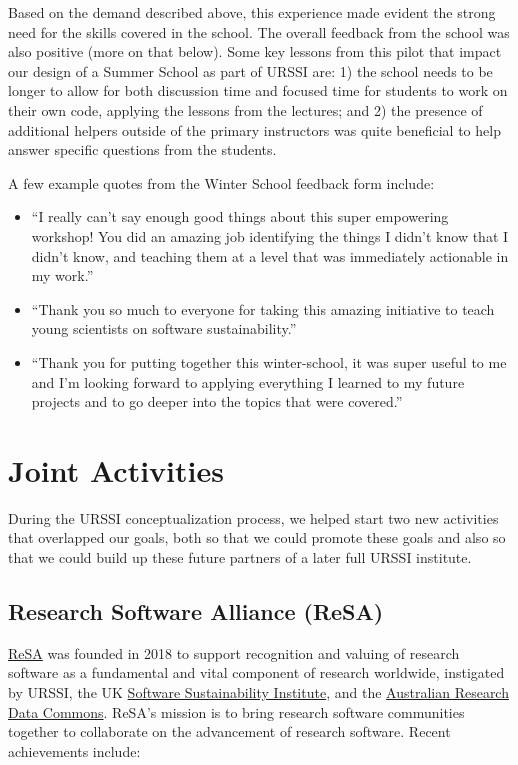 \documentclass[
]{book}
\begin{document}
Based on the demand described above, this experience made evident the strong
need for the skills covered in the school. The overall feedback from the
school was also positive (more on that below). Some key lessons from this
pilot that impact our design of a Summer School as part of URSSI are: 1) the
school needs to be longer to allow for both discussion time and focused time
for students to work on their own code, applying the lessons from the lectures;
and 2) the presence of additional helpers outside of the primary instructors was
quite beneficial to help answer specific questions from the students.

A few example quotes from the Winter School feedback form include:

\begin{itemize}
\item
  ``I really can't say enough good things about this super empowering workshop!
  You did an amazing job identifying the things I didn't know that I didn't know,
  and teaching them at a level that was immediately actionable in my work.''
\item
  ``Thank you so much to everyone for taking this amazing initiative to teach young
  scientists on software sustainability.''
\item
  ``Thank you for putting together this winter-school, it was super useful to me
  and I'm looking forward to applying everything I learned to my future projects
  and to go deeper into the topics that were covered.''
\end{itemize}

\hypertarget{joint-activities}{%
\section{Joint Activities}\label{joint-activities}}

During the URSSI conceptualization process, we helped start two new activities that
overlapped our goals, both so that we could promote these goals and also so
that we could build up these future partners of a later full URSSI institute.

\hypertarget{research-software-alliance-resa}{%
\subsection{Research Software Alliance (ReSA)}\label{research-software-alliance-resa}}

\href{http://www.researchsoft.org}{ReSA} was founded in 2018 to support recognition and valuing of research software as a
fundamental and vital component of research worldwide, instigated by URSSI,
the UK \href{https://software.ac.uk}{Software Sustainability Institute},
and the \href{https://ardc.edu.au}{Australian Research Data Commons}.
ReSA's mission is to bring research
software communities together to collaborate on the advancement of research software.
Recent achievements include:
\end{document}
